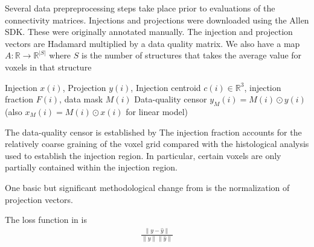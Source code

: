 Several data prepreprocessing steps take place prior to evaluations of the connectivity matrices.
Injections and projections were downloaded using the Allen SDK.
These were originally annotated manually.
The injection and projection vectors are Hadamard multiplied by a data quality matrix. We also have a map $A: \mathbb R \to \mathbb R^{|S|}$ where $S$ is the number of structures that takes the average value for voxels in that structure

\begin{algorithmic}
\begin{algorithm}{Injection $x(i)$, Projection $y(i)$, Injection centroid $c(i) \in \mathbb R^3$, injection fraction $F(i)$, data mask $M(i)$}
\State Data-quality censor $y_M (i) = M(i) \odot y(i)$ (also $x_M(i) = M(i) \odot x(i)$ for linear model)
\end{algorithm}
\end{algorithmic}

The data-quality censor is established by 
The injection fraction accounts for the relatively coarse graining of the voxel grid compared with the histological analysis used to establish the injection region.  In particular, certain voxels are only partially contained within the injection region.


One basic but significant methodological change from \citet{Knox2019-ot} is the normalization of projection vectors.

\begin{comment}
\begin{figure}
    \centering
    \texttt{[image: ]}
    \caption{Caption}
    \label{fig:my_label}
\end{figure}
\end{comment}
The loss function in \citet{Knox2019-ot} is
\begin{eqnarray*}
\frac{\|y - \hat y\|} {\|y\|\|\hat y\|}
\end{eqnarray*}


